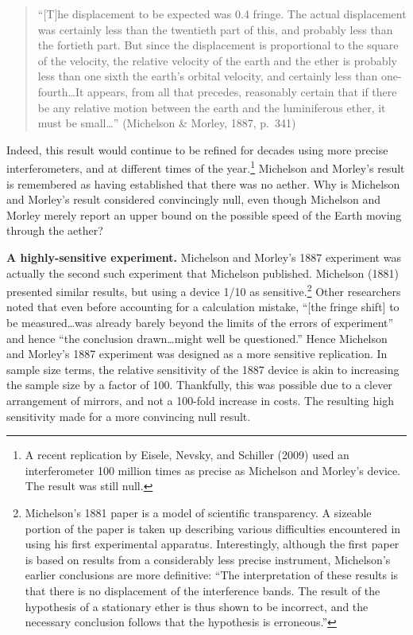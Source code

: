 \documentclass[english,floatsintext,man]{apa6}
\theoremstyle{definition}
\theoremstyle{definition}
\theoremstyle{definition}
\theoremstyle{remark}
\begin{document}
\begin{quote}
\enquote{{[}T{]}he displacement to be expected was 0.4 fringe. The
actual displacement was certainly less than the twentieth part of this,
and probably less than the fortieth part. But since the displacement is
proportional to the square of the velocity, the relative velocity of the
earth and the ether is probably less than one sixth the earth's orbital
velocity, and certainly less than one-fourth\ldots{}It appears, from all
that precedes, reasonably certain that if there be any relative motion
between the earth and the luminiferous ether, it must be small\ldots{}}
(Michelson \& Morley, 1887, p.~341)
\end{quote}

Indeed, this result would continue to be refined for decades using more
precise interferometers, and at different times of the year.\footnote{A
  recent replication by Eisele, Nevsky, and Schiller (2009) used an
  interferometer 100 million times as precise as Michelson and Morley's
  device. The result was still null.} Michelson and Morley's result is
remembered as having established that there was no aether. Why is
Michelson and Morley's result considered convincingly null, even though
Michelson and Morley merely report an upper bound on the possible speed
of the Earth moving through the aether?

\textbf{A highly-sensitive experiment.} Michelson and Morley's 1887
experiment was actually the second such experiment that Michelson
published. Michelson (1881) presented similar results, but using a
device 1/10 as sensitive.\footnote{Michelson's 1881 paper is a model of
  scientific transparency. A sizeable portion of the paper is taken up
  describing various difficulties encountered in using his first
  experimental apparatus. Interestingly, although the first paper is
  based on results from a considerably less precise instrument,
  Michelson's earlier conclusions are more definitive: \enquote{The
  interpretation of these results is that there is no displacement of
  the interference bands. The result of the hypothesis of a stationary
  ether is thus shown to be incorrect, and the necessary conclusion
  follows that the hypothesis is erroneous.}} Other researchers noted
that even before accounting for a calculation mistake, \enquote{{[}the
fringe shift{]} to be measured\ldots{}was already barely beyond the
limits of the errors of experiment} and hence \enquote{the conclusion
drawn\ldots{}might well be questioned.} Hence Michelson and Morley's
1887 experiment was designed as a more sensitive replication. In sample
size terms, the relative sensitivity of the 1887 device is akin to
increasing the sample size by a factor of 100. Thankfully, this was
possible due to a clever arrangement of mirrors, and not a 100-fold
increase in costs. The resulting high sensitivity made for a more
convincing null result.
\end{document}
